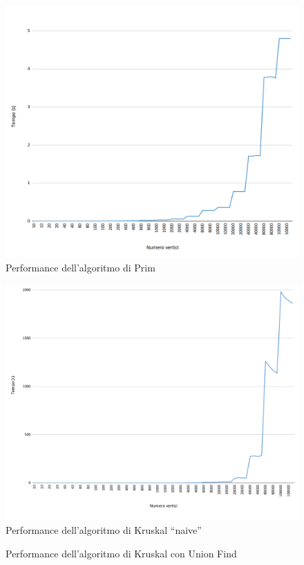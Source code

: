 \begin{figure}[H]
	\hspace{-1cm}\includegraphics[width=19cm]{Img/prim_result.png}
	\caption{Performance dell'algoritmo di Prim}
\end{figure}
\begin{figure}[H]
	\hspace{-1cm}\includegraphics[width=18.5cm]{Img/kruskal_naive_result.png}
	\caption{Performance dell'algoritmo di Kruskal ``naive''}
\end{figure}
\begin{figure}[H]
	\caption{Performance dell'algoritmo di Kruskal con Union Find}
\end{figure}


\pagebreak